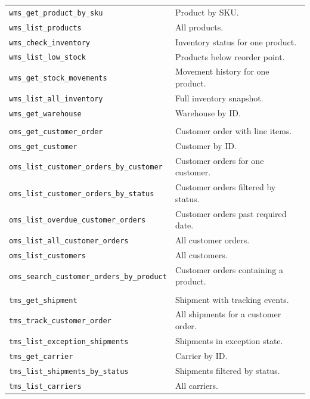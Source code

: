 {\begin{longtable}{@{}p{6.2cm}p{8.5cm}@{}}
\texttt{wms\_get\_product\_by\_sku} & Product by SKU. \\
\texttt{wms\_list\_products} & All products. \\
\texttt{wms\_check\_inventory} & Inventory status for one product. \\
\texttt{wms\_list\_low\_stock} & Products below reorder point. \\
\texttt{wms\_get\_stock\_movements} & Movement history for one product. \\
\texttt{wms\_list\_all\_inventory} & Full inventory snapshot. \\
\texttt{wms\_get\_warehouse} & Warehouse by ID. \\
\addlinespace[4pt]
\multicolumn{2}{@{}l}{\textbf{OMS --- Sales}} \\
\addlinespace[2pt]
\texttt{oms\_get\_customer\_order} & Customer order with line items. \\
\texttt{oms\_get\_customer} & Customer by ID. \\
\texttt{oms\_list\_customer\_orders\_by\_customer} & Customer orders for one customer. \\
\texttt{oms\_list\_customer\_orders\_by\_status} & Customer orders filtered by status. \\
\texttt{oms\_list\_overdue\_customer\_orders} & Customer orders past required date. \\
\texttt{oms\_list\_all\_customer\_orders} & All customer orders. \\
\texttt{oms\_list\_customers} & All customers. \\
\texttt{oms\_search\_customer\_orders\_by\_product} & Customer orders containing a product. \\
\addlinespace[4pt]
\multicolumn{2}{@{}l}{\textbf{TMS --- Shipping}} \\
\addlinespace[2pt]
\texttt{tms\_get\_shipment} & Shipment with tracking events. \\
\texttt{tms\_track\_customer\_order} & All shipments for a customer order. \\
\texttt{tms\_list\_exception\_shipments} & Shipments in exception state. \\
\texttt{tms\_get\_carrier} & Carrier by ID. \\
\texttt{tms\_list\_shipments\_by\_status} & Shipments filtered by status. \\
\texttt{tms\_list\_carriers} & All carriers. \\
\bottomrule
\end{longtable}
}
